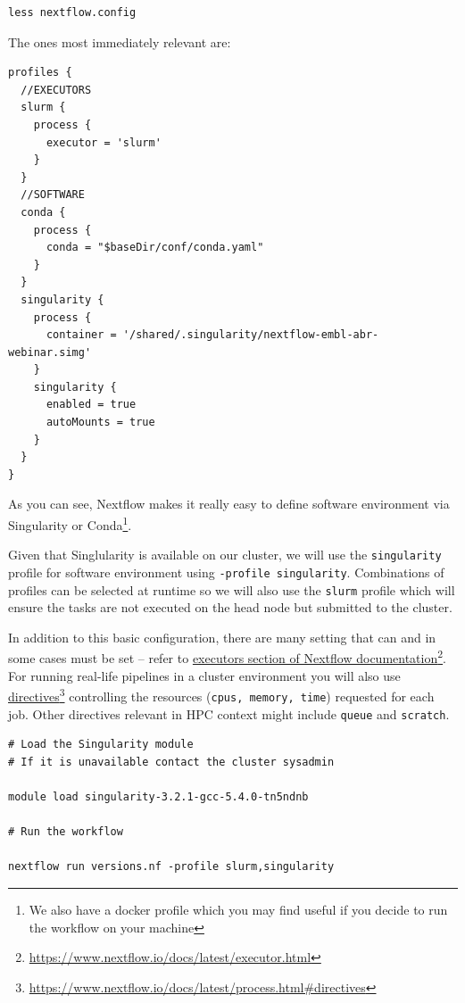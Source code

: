\begin{steps}
\begin{lstlisting}
less nextflow.config
\end{lstlisting}
\end{steps}

The ones most immediately relevant are:

\begin{lstlisting}
profiles {
  //EXECUTORS
  slurm {
    process {
      executor = 'slurm'
    }
  }
  //SOFTWARE
  conda {
    process {
      conda = "$baseDir/conf/conda.yaml"
    }
  }
  singularity {
    process {
      container = '/shared/.singularity/nextflow-embl-abr-webinar.simg' 
    }
    singularity {
      enabled = true
      autoMounts = true
    }
  }
}
\end{lstlisting}


As you can see, Nextflow makes it really easy to define software environment via Singularity 
or Conda\footnote{We also have a docker profile which you may find useful if you decide to run the workflow on your machine}. 


Given that Singlularity is available on our cluster, we will use the \texttt{singularity} profile for software environment using \texttt{-profile singularity}. Combinations of profiles can be selected at runtime 
so we will also use the \texttt{slurm} profile which will ensure the tasks are not executed on the head node but submitted to the cluster.

In addition to this basic configuration, there are many setting that can and in some cases must be set -- refer to 
\href{https://www.nextflow.io/docs/latest/executor.html}{executors section of Nextflow documentation}\footnote{\url{https://www.nextflow.io/docs/latest/executor.html}}. 
For running real-life pipelines in a cluster environment you will also use 
\href{https://www.nextflow.io/docs/latest/process.html#directives}{directives}\footnote{\url{https://www.nextflow.io/docs/latest/process.html\#directives}}
controlling the resources (\texttt{cpus, memory, time}) requested for each job. Other directives relevant in HPC context might include \texttt{queue} and \texttt{scratch}.



\begin{steps}
\begin{lstlisting}
# Load the Singularity module 
# If it is unavailable contact the cluster sysadmin

module load singularity-3.2.1-gcc-5.4.0-tn5ndnb

# Run the workflow

nextflow run versions.nf -profile slurm,singularity
\end{lstlisting}
\end{steps}


